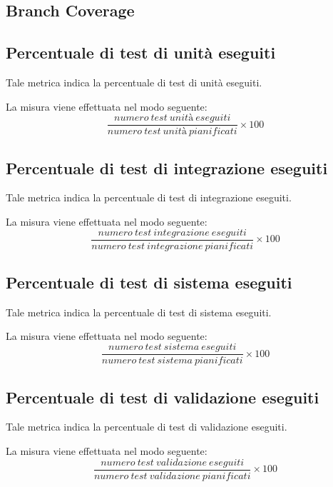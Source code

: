 \subsection{Branch Coverage}



\subsection{Percentuale di test di unità eseguiti}
Tale metrica indica la percentuale di test di unità eseguiti.

La misura viene effettuata nel modo seguente:
\begin{equation}
	\frac{numero~test~unità~eseguiti}{numero~test~unità~pianificati}\times100
\end{equation}



\subsection{Percentuale di test di integrazione eseguiti}
Tale metrica indica la percentuale di test di integrazione eseguiti.

La misura viene effettuata nel modo seguente:
\begin{equation}
	\frac{numero~test~integrazione~eseguiti}{numero~test~integrazione~pianificati}\times100
\end{equation}



\subsection{Percentuale di test di sistema eseguiti}
Tale metrica indica la percentuale di test di sistema eseguiti.

La misura viene effettuata nel modo seguente:
\begin{equation}
	\frac{numero~test~sistema~eseguiti}{numero~test~sistema~pianificati}\times100
\end{equation}



\subsection{Percentuale di test di validazione eseguiti}
Tale metrica indica la percentuale di test di validazione eseguiti.

La misura viene effettuata nel modo seguente:
\begin{equation}
	\frac{numero~test~validazione~eseguiti}{numero~test~validazione~pianificati}\times100
\end{equation}



